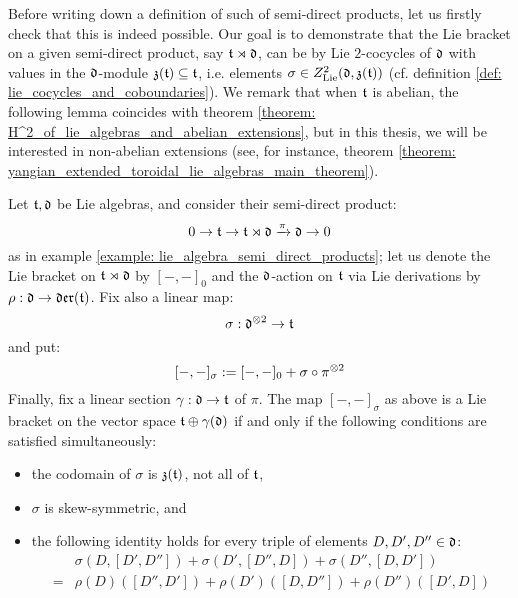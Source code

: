         Before writing down a definition of such  of semi-direct products, let us firstly check that this is indeed possible. Our goal is to demonstrate that the Lie bracket on a given semi-direct product, say $\mathfrak{t} \rtimes \mathfrak{d}$, can be  by Lie $2$-cocycles of $\mathfrak{d}$ with values in the $\mathfrak{d}$-module $\mathfrak{z}(\mathfrak{t}) \subseteq \mathfrak{t}$, i.e. elements $\sigma \in Z^2_{\mathrm{Lie}}(\mathfrak{d}, \mathfrak{z}(\mathfrak{t}))$ (cf. definition \ref{def: lie_cocycles_and_coboundaries}). We remark that when $\mathfrak{t}$ is abelian, the following lemma coincides with theorem \ref{theorem: H^2_of_lie_algebras_and_abelian_extensions}, but in this thesis, we will be interested in non-abelian extensions (see, for instance, theorem \ref{theorem: yangian_extended_toroidal_lie_algebras_main_theorem}).
        \begin{lemma} \label{lemma: twisted_semi_direct_products_well_definiteness}
            Let $\mathfrak{t}, \mathfrak{d}$ be Lie algebras, and consider their semi-direct product:
                $$0 \to \mathfrak{t} \to \mathfrak{t} \rtimes \mathfrak{d} \xrightarrow[]{\pi} \mathfrak{d} \to 0$$
            as in example \ref{example: lie_algebra_semi_direct_products}; let us denote the Lie bracket on $\mathfrak{t} \rtimes \mathfrak{d}$ by $[-, -]_0$ and the $\mathfrak{d}$-action on $\mathfrak{t}$ via Lie derivations by $\rho: \mathfrak{d} \to \mathfrak{der}(\mathfrak{t})$. Fix also a linear map:
                $$\sigma: \d^{\tensor 2} \to \t$$
            and put:
                \begin{equation} \label{equation: twisted_semi_direct_product_bracket}
                    [-, -]_{\sigma} := [-, -]_0 + \sigma \circ \pi^{\tensor 2}
                \end{equation}
            Finally, fix a linear section $\gamma: \mathfrak{d} \to \mathfrak{t}$ of $\pi$. The map $[-, -]_{\sigma}$ as above is a Lie bracket on the vector space $\mathfrak{t} \oplus \gamma(\mathfrak{d})$ if and only if the following conditions are satisfied simultaneously:
            \begin{itemize}
                \item the codomain of $\sigma$ is $\mathfrak{z}(\mathfrak{t})$, not all of $\mathfrak{t}$,
                \item $\sigma$ is skew-symmetric, and
                \item the following identity holds for every triple of elements $D, D', D'' \in \mathfrak{d}$:
                    $$
                        \begin{aligned}
                            & \sigma( D, [D', D''] ) + \sigma( D', [D'', D] ) + \sigma( D'', [D, D'] )
                            \\
                            = & \rho(D)( [D'', D'] ) + \rho(D')( [D, D''] ) + \rho(D'')( [D', D] )
                        \end{aligned}
                    $$
            \end{itemize}
        \end{lemma}
